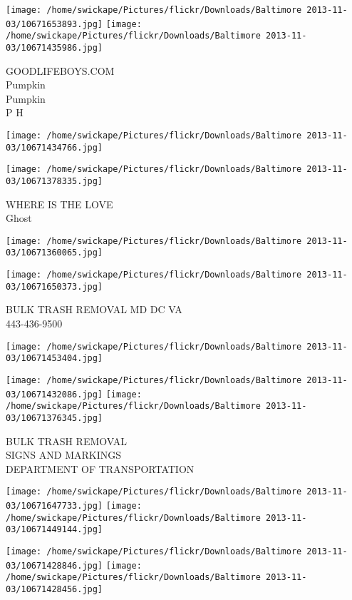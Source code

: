 \documentclass[10pt,letterpaper]{article}
\begin{document}
\texttt{[image: /home/swickape/Pictures/flickr/Downloads/Baltimore 2013-11-03/10671653893.jpg]}
\texttt{[image: /home/swickape/Pictures/flickr/Downloads/Baltimore 2013-11-03/10671435986.jpg]}

GOODLIFEBOYS.COM\\
Pumpkin\\
Pumpkin\\
P H
\pagebreak

\texttt{[image: /home/swickape/Pictures/flickr/Downloads/Baltimore 2013-11-03/10671434766.jpg]}

\vspace{0.25in}
\texttt{[image: /home/swickape/Pictures/flickr/Downloads/Baltimore 2013-11-03/10671378335.jpg]}

WHERE IS THE LOVE\\
Ghost
\pagebreak

\texttt{[image: /home/swickape/Pictures/flickr/Downloads/Baltimore 2013-11-03/10671360065.jpg]}

\vspace{0.25in}
\texttt{[image: /home/swickape/Pictures/flickr/Downloads/Baltimore 2013-11-03/10671650373.jpg]}

BULK TRASH REMOVAL MD DC VA\\
443{-}436{-}9500
\pagebreak

\texttt{[image: /home/swickape/Pictures/flickr/Downloads/Baltimore 2013-11-03/10671453404.jpg]}

\vspace{0.25in}
\texttt{[image: /home/swickape/Pictures/flickr/Downloads/Baltimore 2013-11-03/10671432086.jpg]}
\texttt{[image: /home/swickape/Pictures/flickr/Downloads/Baltimore 2013-11-03/10671376345.jpg]}

BULK TRASH REMOVAL\\
SIGNS AND MARKINGS\\
DEPARTMENT OF TRANSPORTATION
\pagebreak

\texttt{[image: /home/swickape/Pictures/flickr/Downloads/Baltimore 2013-11-03/10671647733.jpg]}
\texttt{[image: /home/swickape/Pictures/flickr/Downloads/Baltimore 2013-11-03/10671449144.jpg]}

\texttt{[image: /home/swickape/Pictures/flickr/Downloads/Baltimore 2013-11-03/10671428846.jpg]}
\texttt{[image: /home/swickape/Pictures/flickr/Downloads/Baltimore 2013-11-03/10671428456.jpg]}
\end{document}
